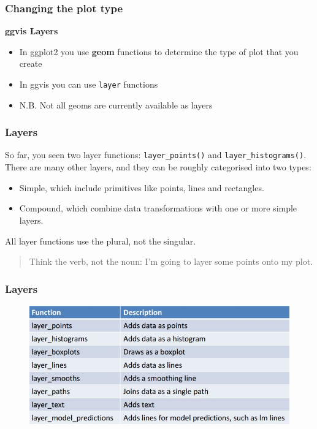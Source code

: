 \documentclass[MASTER.tex]{subfiles}
\begin{document}
 

\begin{frame}
	
\frametitle{Changing the plot type}
\vspace{-1cm}
\Large
\textbf{ggvis Layers}\\
\begin{itemize}
\item In ggplot2 you use \textbf{geom} functions to determine
the type of plot that you create
\item In ggvis you can use \texttt{layer} functions
\item N.B. Not all geoms are currently available as layers
\end{itemize}


\end{frame}
\begin{frame}[fragile]
	\frametitle{Layers}
	\large
So far, you seen two layer functions: \texttt{layer\_points()} and \texttt{layer\_histograms()}. There are many other layers, and they can be roughly categorised into two types:

\begin{itemize}
\item Simple, which include primitives like points, lines and rectangles.

\item Compound, which combine data transformations with one or more simple layers.
\end{itemize}
All layer functions use the plural, not the singular. 
\begin{quote}Think the verb, not the noun: I’m going to layer some points onto my plot.
\end{quote}
\end{frame}
\begin{frame}
	\frametitle{Layers}

\begin{figure}
\centering
\includegraphics[width=1.19\linewidth]{images/ggvislayers}

\end{figure}

	
\end{frame}
\end{document}
